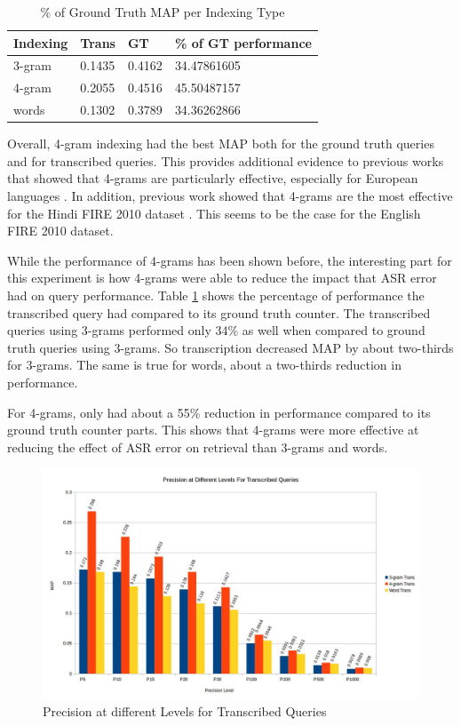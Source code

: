 \documentclass[jair, twoside,11pt,theapa]{article}
\begin{document}
\begin{table}[]
\centering
\caption{\% of Ground Truth MAP per Indexing Type}
\label{MAP_mitigation}
\begin{tabular}{|l|l|l|l|}
\hline
Indexing & Trans  & GT     & \% of GT performance      \\ \hline
3-gram    & 0.1435 & 0.4162 & 34.47861605 \\ \hline
4-gram    & 0.2055 & 0.4516 & 45.50487157 \\ \hline
words    & 0.1302 & 0.3789 & 34.36262866 \\ \hline
\end{tabular}
\end{table}

Overall, 4-gram indexing had the best MAP both for the ground truth queries and for transcribed queries. This provides additional evidence to previous works that showed that 4-grams are particularly effective, especially for European languages \cite{McNamee2004}. In addition, previous work showed that 4-grams are the most effective for the Hindi FIRE 2010 dataset \cite{Vishwakarma}. This seems to be the case for the English FIRE 2010 dataset. 

While the performance of 4-grams has been shown before, the interesting part for this experiment is how 4-grams were able to reduce the impact that ASR error had on query performance. Table \ref{MAP_mitigation} shows the percentage of performance the transcribed query had compared to its ground truth counter. The transcribed queries using 3-grams performed only 34\% as well when compared to ground truth queries using 3-grams. So transcription decreased MAP by about two-thirds for 3-grams. The same is true for words, about a two-thirds reduction in performance. 

For 4-grams, only had about a 55\% reduction in performance compared to its ground truth counter parts. This shows that 4-grams were more effective at reducing the effect of ASR error on retrieval than 3-grams and words. 

\begin{figure}
\centering
\includegraphics[width=1.0\linewidth]{../ResultImages/Precisions}
\caption{Precision at different Levels for Transcribed Queries}
\label{fig:Precisions}
\end{figure}
\end{document}
